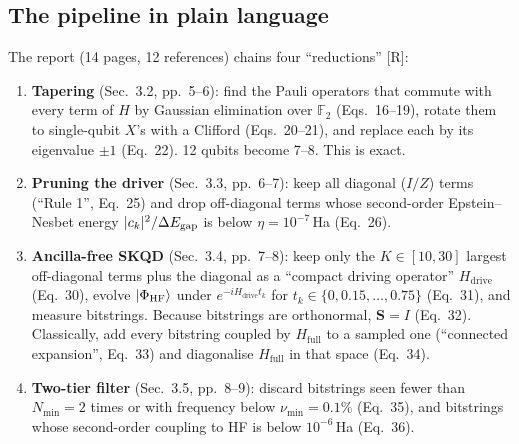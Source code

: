 \documentclass[11pt,a4paper]{article}
\newcommand{\ket}[1]{\lvert #1\rangle}
\newcommand{\Hd}{H_{\mathrm{drive}}}
\newcommand{\Ht}{H_{\mathrm{full}}}
\newcommand{\lR}{\textcolor{keyblue}{[R]}}   %
\begin{document}
\subsection{The pipeline in plain language}
The report (14 pages, 12 references) chains four ``reductions'' \lR:
\begin{enumerate}
\item \textbf{Tapering} (Sec.~3.2, pp.~5--6): find the Pauli operators that commute with every term of $H$ by Gaussian elimination over $\mathbb{F}_2$ (Eqs.~16--19), rotate them to single-qubit $X$'s with a Clifford (Eqs.~20--21), and replace each by its eigenvalue $\pm1$ (Eq.~22). 12 qubits become 7--8. This is exact.
\item \textbf{Pruning the driver} (Sec.~3.3, pp.~6--7): keep all diagonal ($I/Z$) terms (``Rule 1'', Eq.~25) and drop off-diagonal terms whose second-order Epstein--Nesbet energy $|c_k|^2/\Delta E_{\rm gap}$ is below $\eta=10^{-7}$\,Ha (Eq.~26).
\item \textbf{Ancilla-free SKQD} (Sec.~3.4, pp.~7--8): keep only the $K\in[10,30]$ largest off-diagonal terms plus the diagonal as a ``compact driving operator'' $\Hd$ (Eq.~30), evolve $\ket{\Phi_{\rm HF}}$ under $e^{-i\Hd t_k}$ for $t_k\in\{0,0.15,\dots,0.75\}$ (Eq.~31), and measure bitstrings. Because bitstrings are orthonormal, $\mathbf S=I$ (Eq.~32). Classically, add every bitstring coupled by $\Ht$ to a sampled one (``connected expansion'', Eq.~33) and diagonalise $\Ht$ in that space (Eq.~34).
\item \textbf{Two-tier filter} (Sec.~3.5, pp.~8--9): discard bitstrings seen fewer than $N_{\min}=2$ times or with frequency below $\nu_{\min}=0.1\%$ (Eq.~35), and bitstrings whose second-order coupling to HF is below $10^{-6}$\,Ha (Eq.~36).
\end{enumerate}
\end{document}
